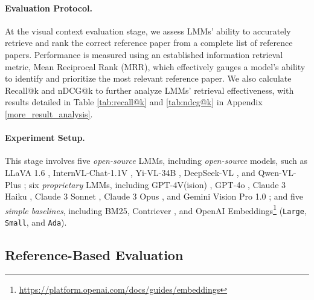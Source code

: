\paragraph{Evaluation Protocol.}

At the visual context evaluation stage, we assess LMMs' ability to accurately retrieve and rank the correct reference paper from a complete list of reference papers. 
%
Performance is measured using an established information retrieval metric, Mean Reciprocal Rank (MRR), which effectively gauges a model's ability to identify and prioritize the most relevant reference paper. 
%
We also calculate Recall@k and nDCG@k to further analyze LMMs' retrieval effectiveness, with results detailed in Table \ref{tab:recall@k} and \ref{tab:ndcg@k} in Appendix \ref{more_result_analysis}.



\paragraph{Experiment Setup.}
This stage involves five \emph{open-source} LMMs, including \emph{open-source} models, such as 
LLaVA 1.6 \cite{liu2023visual}, 
InternVL-Chat-1.1V \cite{chen2024internvl}, 
Yi-VL-34B \citep{ai2024yi},
DeepSeek-VL \citep{deepseekvl},
and Qwen-VL-Plus \cite{bai2023qwenvl}; 
six \emph{proprietary} LMMs, including 
GPT-4V(ision) \cite{openai2024gpt4},
GPT-4o \cite{gpt-4o}, 
Claude 3 Haiku \citep{claude3},
Claude 3 Sonnet \citep{claude3},
Claude 3 Opus \citep{claude3},
and Gemini Vision Pro 1.0 \cite{geminiteam2023gemini}; 
and five \emph{simple baselines}, including 
BM25, 
Contriever \cite{izacard2021contriever}, 
and OpenAI Embeddings\footnote{\url{https://platform.openai.com/docs/guides/embeddings}} (\texttt{Large}, \texttt{Small}, and \texttt{Ada}).



\subsection{Reference-Based Evaluation}

